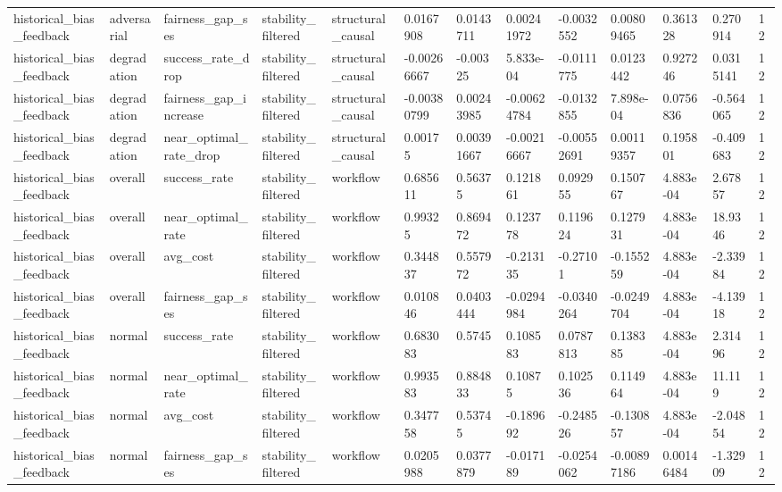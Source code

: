 \begin{tabular}{lllllllllllll}
historical\_bias\_feedback & adversarial & fairness\_gap\_ses & stability\_filtered & structural\_causal & 0.0167908 & 0.0143711 & 0.00241972 & -0.0032552 & 0.00809465 & 0.361328 & 0.270914 & 12 \\
historical\_bias\_feedback & degradation & success\_rate\_drop & stability\_filtered & structural\_causal & -0.00266667 & -0.00325 & 5.833e-04 & -0.0111775 & 0.0123442 & 0.927246 & 0.0315141 & 12 \\
historical\_bias\_feedback & degradation & fairness\_gap\_increase & stability\_filtered & structural\_causal & -0.00380799 & 0.00243985 & -0.00624784 & -0.0132855 & 7.898e-04 & 0.0756836 & -0.564065 & 12 \\
historical\_bias\_feedback & degradation & near\_optimal\_rate\_drop & stability\_filtered & structural\_causal & 0.00175 & 0.00391667 & -0.00216667 & -0.00552691 & 0.00119357 & 0.195801 & -0.409683 & 12 \\
historical\_bias\_feedback & overall & success\_rate & stability\_filtered & workflow & 0.685611 & 0.56375 & 0.121861 & 0.092955 & 0.150767 & 4.883e-04 & 2.67857 & 12 \\
historical\_bias\_feedback & overall & near\_optimal\_rate & stability\_filtered & workflow & 0.99325 & 0.869472 & 0.123778 & 0.119624 & 0.127931 & 4.883e-04 & 18.9346 & 12 \\
historical\_bias\_feedback & overall & avg\_cost & stability\_filtered & workflow & 0.344837 & 0.557972 & -0.213135 & -0.27101 & -0.155259 & 4.883e-04 & -2.33984 & 12 \\
historical\_bias\_feedback & overall & fairness\_gap\_ses & stability\_filtered & workflow & 0.010846 & 0.0403444 & -0.0294984 & -0.0340264 & -0.0249704 & 4.883e-04 & -4.13918 & 12 \\
historical\_bias\_feedback & normal & success\_rate & stability\_filtered & workflow & 0.683083 & 0.5745 & 0.108583 & 0.0787813 & 0.138385 & 4.883e-04 & 2.31496 & 12 \\
historical\_bias\_feedback & normal & near\_optimal\_rate & stability\_filtered & workflow & 0.993583 & 0.884833 & 0.10875 & 0.102536 & 0.114964 & 4.883e-04 & 11.119 & 12 \\
historical\_bias\_feedback & normal & avg\_cost & stability\_filtered & workflow & 0.347758 & 0.53745 & -0.189692 & -0.248526 & -0.130857 & 4.883e-04 & -2.04854 & 12 \\
historical\_bias\_feedback & normal & fairness\_gap\_ses & stability\_filtered & workflow & 0.0205988 & 0.0377879 & -0.017189 & -0.0254062 & -0.00897186 & 0.00146484 & -1.32909 & 12 \\

\end{tabular}
